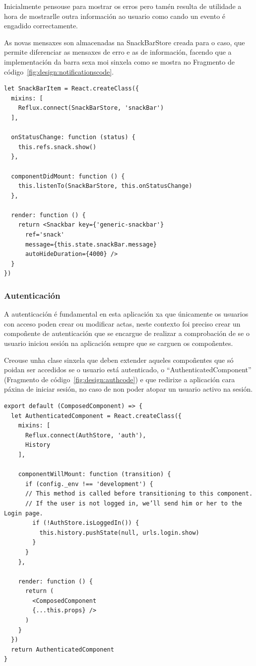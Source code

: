       Inicialmente pensouse para mostrar os erros pero tamén resulta de 
utilidade a hora de mostrarlle outra información ao usuario como cando un 
evento é engadido correctamente.

      As novas mensaxes son almacenadas na SnackBarStore creada para o caso, 
que permite diferenciar as mensaxes de erro e as de información, facendo que a 
implementación da barra sexa moi sinxela como se mostra no Fragmento de 
código~\ref{fig:design:notificationscode}.

    \lstset{}
      \begin{lstlisting}[caption=Barra de notificacións., 
label=fig:design:notificationscode]
let SnackBarItem = React.createClass({
  mixins: [
    Reflux.connect(SnackBarStore, 'snackBar')
  ],

  onStatusChange: function (status) {
    this.refs.snack.show()
  },

  componentDidMount: function () {
    this.listenTo(SnackBarStore, this.onStatusChange)
  },

  render: function () {
    return <Snackbar key={'generic-snackbar'}
      ref='snack'
      message={this.state.snackBar.message}
      autoHideDuration={4000} />
  }
})

      \end{lstlisting}

      \subsubsection{Autenticación}
      A autenticación é fundamental en esta aplicación xa que únicamente os 
usuarios con acceso poden crear ou modificar actas, neste contexto foi preciso 
crear un compoñente de autenticación que se encargue de realizar a comprobación 
de se o usuario iniciou sesión na aplicación sempre que se carguen os 
compoñentes.

      Creouse unha clase sinxela que deben extender aqueles compoñentes que só 
poidan ser accedidos se o usuario está autenticado, o 
``AuthenticatedComponent'' (Fragmento de código~\ref{fig:design:authcode}) e 
que redirixe a aplicación cara páxina de iniciar sesión, no caso de non poder 
atopar un usuario activo na sesión.

    \lstset{}
    \begin{lstlisting}[caption=Compoñente de autenticación., 
label=fig:design:authcode]
export default (ComposedComponent) => {
  let AuthenticatedComponent = React.createClass({
    mixins: [
      Reflux.connect(AuthStore, 'auth'),
      History
    ],

    componentWillMount: function (transition) {
      if (config._env !== 'development') {
      // This method is called before transitioning to this component.
      // If the user is not logged in, we’ll send him or her to the Login page.
        if (!AuthStore.isLoggedIn()) {
          this.history.pushState(null, urls.login.show)
        }
      }
    },

    render: function () {
      return (
        <ComposedComponent
        {...this.props} />
      )
    }
  })
  return AuthenticatedComponent
}
    \end{lstlisting}

